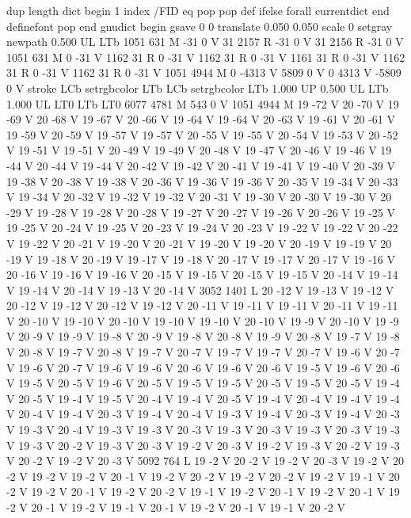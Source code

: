 {{{{{dup length dict begin {1 index /FID eq {pop pop} {def} ifelse} forall
currentdict end definefont pop
end
gnudict begin
gsave
0 0 translate
0.050 0.050 scale
0 setgray
newpath
0.500 UL
LTb
1051 631 M
-31 0 V
31 2157 R
-31 0 V
31 2156 R
-31 0 V
1051 631 M
0 -31 V
1162 31 R
0 -31 V
1162 31 R
0 -31 V
1161 31 R
0 -31 V
1162 31 R
0 -31 V
1162 31 R
0 -31 V
1051 4944 M
0 -4313 V
5809 0 V
0 4313 V
-5809 0 V
stroke
LCb setrgbcolor
LTb
LCb setrgbcolor
LTb
1.000 UP
0.500 UL
LTb
1.000 UL
LT0
LTb
LT0
6077 4781 M
543 0 V
1051 4944 M
19 -72 V
20 -70 V
19 -69 V
20 -68 V
19 -67 V
20 -66 V
19 -64 V
19 -64 V
20 -63 V
19 -61 V
20 -61 V
19 -59 V
20 -59 V
19 -57 V
19 -57 V
20 -55 V
19 -55 V
20 -54 V
19 -53 V
20 -52 V
19 -51 V
19 -51 V
20 -49 V
19 -49 V
20 -48 V
19 -47 V
20 -46 V
19 -46 V
19 -44 V
20 -44 V
19 -44 V
20 -42 V
19 -42 V
20 -41 V
19 -41 V
19 -40 V
20 -39 V
19 -38 V
20 -38 V
19 -38 V
20 -36 V
19 -36 V
19 -36 V
20 -35 V
19 -34 V
20 -33 V
19 -34 V
20 -32 V
19 -32 V
19 -32 V
20 -31 V
19 -30 V
20 -30 V
19 -30 V
20 -29 V
19 -28 V
19 -28 V
20 -28 V
19 -27 V
20 -27 V
19 -26 V
20 -26 V
19 -25 V
19 -25 V
20 -24 V
19 -25 V
20 -23 V
19 -24 V
20 -23 V
19 -22 V
19 -22 V
20 -22 V
19 -22 V
20 -21 V
19 -20 V
20 -21 V
19 -20 V
19 -20 V
20 -19 V
19 -19 V
20 -19 V
19 -18 V
20 -19 V
19 -17 V
19 -18 V
20 -17 V
19 -17 V
20 -17 V
19 -16 V
20 -16 V
19 -16 V
19 -16 V
20 -15 V
19 -15 V
20 -15 V
19 -15 V
20 -14 V
19 -14 V
19 -14 V
20 -14 V
19 -13 V
20 -14 V
3052 1401 L
20 -12 V
19 -13 V
19 -12 V
20 -12 V
19 -12 V
20 -12 V
19 -12 V
20 -11 V
19 -11 V
19 -11 V
20 -11 V
19 -11 V
20 -10 V
19 -10 V
20 -10 V
19 -10 V
19 -10 V
20 -10 V
19 -9 V
20 -10 V
19 -9 V
20 -9 V
19 -9 V
19 -8 V
20 -9 V
19 -8 V
20 -8 V
19 -9 V
20 -8 V
19 -7 V
19 -8 V
20 -8 V
19 -7 V
20 -8 V
19 -7 V
20 -7 V
19 -7 V
19 -7 V
20 -7 V
19 -6 V
20 -7 V
19 -6 V
20 -7 V
19 -6 V
19 -6 V
20 -6 V
19 -6 V
20 -6 V
19 -5 V
19 -6 V
20 -6 V
19 -5 V
20 -5 V
19 -6 V
20 -5 V
19 -5 V
19 -5 V
20 -5 V
19 -5 V
20 -5 V
19 -4 V
20 -5 V
19 -4 V
19 -5 V
20 -4 V
19 -4 V
20 -5 V
19 -4 V
20 -4 V
19 -4 V
19 -4 V
20 -4 V
19 -4 V
20 -3 V
19 -4 V
20 -4 V
19 -3 V
19 -4 V
20 -3 V
19 -4 V
20 -3 V
19 -3 V
20 -4 V
19 -3 V
19 -3 V
20 -3 V
19 -3 V
20 -3 V
19 -3 V
20 -3 V
19 -3 V
19 -3 V
20 -2 V
19 -3 V
20 -3 V
19 -2 V
20 -3 V
19 -2 V
19 -3 V
20 -2 V
19 -3 V
20 -2 V
19 -2 V
20 -3 V
5092 764 L
19 -2 V
20 -2 V
19 -2 V
20 -3 V
19 -2 V
20 -2 V
19 -2 V
19 -2 V
20 -1 V
19 -2 V
20 -2 V
19 -2 V
20 -2 V
19 -2 V
19 -1 V
20 -2 V
19 -2 V
20 -1 V
19 -2 V
20 -2 V
19 -1 V
19 -2 V
20 -1 V
19 -2 V
20 -1 V
19 -2 V
20 -1 V
19 -2 V
19 -1 V
20 -1 V
19 -2 V
20 -1 V
19 -1 V
20 -2 V
}}}}}
